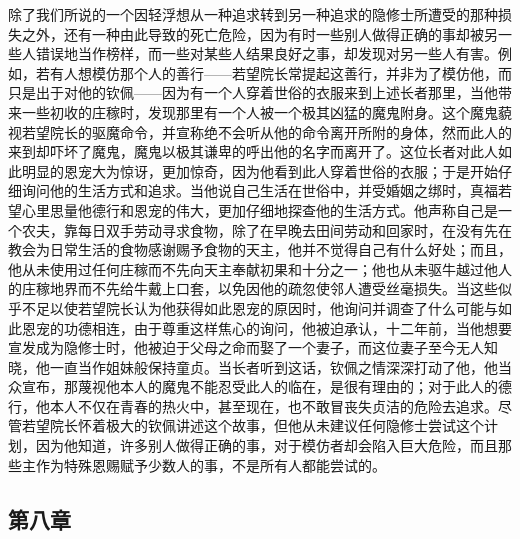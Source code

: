 除了我们所说的一个因轻浮想从一种追求转到另一种追求的隐修士所遭受的那种损失之外，还有一种由此导致的死亡危险，因为有时一些别人做得正确的事却被另一些人错误地当作榜样，而一些对某些人结果良好之事，却发现对另一些人有害。例如，若有人想模仿那个人的善行——若望院长常提起这善行，并非为了模仿他，而只是出于对他的钦佩——因为有一个人穿着世俗的衣服来到上述长者那里，当他带来一些初收的庄稼时，发现那里有一个人被一个极其凶猛的魔鬼附身。这个魔鬼藐视若望院长的驱魔命令，并宣称绝不会听从他的命令离开所附的身体，然而此人的来到却吓坏了魔鬼，魔鬼以极其谦卑的呼出他的名字而离开了。这位长者对此人如此明显的恩宠大为惊讶，更加惊奇，因为他看到此人穿着世俗的衣服；于是开始仔细询问他的生活方式和追求。当他说自己生活在世俗中，并受婚姻之绑时，真福若望心里思量他德行和恩宠的伟大，更加仔细地探查他的生活方式。他声称自己是一个农夫，靠每日双手劳动寻求食物，除了在早晚去田间劳动和回家时，在没有先在教会为日常生活的食物感谢赐予食物的天主，他并不觉得自己有什么好处；而且，他从未使用过任何庄稼而不先向天主奉献初果和十分之一；他也从未驱牛越过他人的庄稼地界而不先给牛戴上口套，以免因他的疏忽使邻人遭受丝毫损失。当这些似乎不足以使若望院长认为他获得如此恩宠的原因时，他询问并调查了什么可能与如此恩宠的功德相连，由于尊重这样焦心的询问，他被迫承认，十二年前，当他想要宣发成为隐修士时，他被迫于父母之命而娶了一个妻子，而这位妻子至今无人知晓，他一直当作姐妹般保持童贞。当长者听到这话，钦佩之情深深打动了他，他当众宣布，那蔑视他本人的魔鬼不能忍受此人的临在，是很有理由的；对于此人的德行，他本人不仅在青春的热火中，甚至现在，也不敢冒丧失贞洁的危险去追求。尽管若望院长怀着极大的钦佩讲述这个故事，但他从未建议任何隐修士尝试这个计划，因为他知道，许多别人做得正确的事，对于模仿者却会陷入巨大危险，而且那些主作为特殊恩赐赋予少数人的事，不是所有人都能尝试的。\par


\subsection{第八章}

\par

